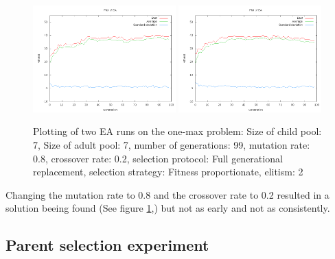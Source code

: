 \documentclass[11pt]{article}
\begin{document}
\begin{figure}[ht]
\begin{center}
\mbox{\includegraphics[width=0.49\textwidth]{images/41.png}}
\mbox{\includegraphics[width=0.49\textwidth]{images/42.png}}
\end{center}
\caption{Plotting of two EA runs on the one-max problem:
Size of child pool: 7,
Size of adult pool: 7,
number of generations: 99,
mutation rate: 0.8,
crossover rate: 0.2,
selection protocol: Full generational replacement,
selection strategy: Fitness proportionate,
elitism: 2}
\label{fig:4}
\end{figure}
Changing the mutation rate to 0.8 and the crossover rate to 0.2 resulted in a solution
beeing found (See figure \ref{fig:4},) but not as early and not as consistently.

\subsection*{Parent selection experiment} %
\end{document}
